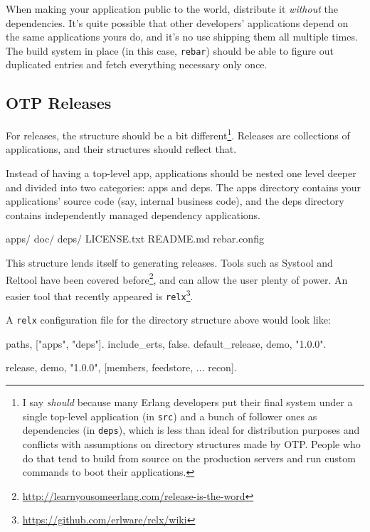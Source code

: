 \documentclass[11pt, oneside]{book}   	%
\newcommand{\filename}[1]{\Verb`#1`}
\newcommand{\app}[1]{\Verb`#1`}
\begin{document}
When making your application public to the world, distribute it \emph{without} the dependencies. It's quite possible that other developers' applications depend on the same applications yours do, and it's no use shipping them all multiple times. The build system in place (in this case, \app{rebar}) should be able to figure out duplicated entries and fetch everything necessary only once.


\subsection{OTP Releases}
\label{subsec:building-otp-releases}

For releases, the structure should be a bit different\footnote{I say \emph{should} because many Erlang developers put their final system under a single top-level application (in \filename{src}) and a bunch of follower ones as dependencies (in \filename{deps}), which is less than ideal for distribution purposes and conflicts with assumptions on directory structures made by OTP. People who do that tend to build from source on the production servers and run custom commands to boot their applications.}. Releases are collections of applications, and their structures should reflect that.

Instead of having a top-level app, applications should be nested one level deeper and divided into two categories: apps and deps. The apps directory contains your applications' source code (say, internal business code), and the deps directory contains independently managed dependency applications.

\begin{VerbatimRaw}
apps/
doc/
deps/
LICENSE.txt
README.md
rebar.config
\end{VerbatimRaw}

This structure lends itself to generating releases. Tools such as Systool and Reltool have been covered before\footnote{\href{http://learnyousomeerlang.com/release-is-the-word}{http://learnyousomeerlang.com/release-is-the-word}}, and can allow the user plenty of power. An easier tool that recently appeared is \app{relx}\footnote{\href{https://github.com/erlware/relx/wiki}{https://github.com/erlware/relx/wiki}}.

A  \app{relx} configuration file for the directory structure above would look like:

\begin{VerbatimText}
{paths, ["apps", "deps"]}.
{include_erts, false}. %
{default_release, demo, "1.0.0"}.

{release, {demo, "1.0.0"},
    [members,
     feedstore,
     ...
     recon]}.
\end{VerbatimText}
\end{document}
